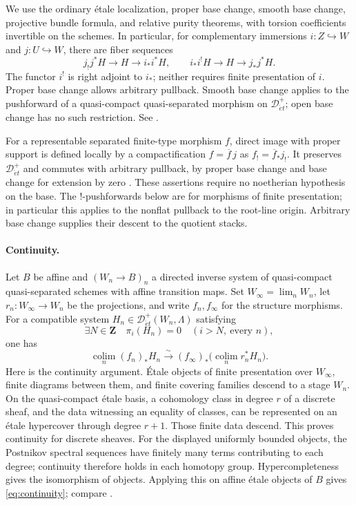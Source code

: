 \documentclass[11pt,a4paper]{article}
\newcommand{\Z}{\mathbf Z}
\newcommand{\colim}{\operatorname*{colim}}
\newcommand{\Det}{\mathcal D_{\acute et}}
\theoremstyle{notes}
\begin{document}
We use the ordinary étale localization, proper base change, smooth base change, projective bundle formula, and relative purity theorems, with torsion coefficients invertible on the schemes. In particular, for complementary immersions $i:Z\hookrightarrow W$ and $j:U\hookrightarrow W$, there are fiber sequences
\[
j_!j^*H\longrightarrow H\longrightarrow i_*i^*H,
\qquad i_*i^!H\longrightarrow H\longrightarrow j_*j^*H.
\]
The functor $i^!$ is right adjoint to $i_*$; neither requires finite presentation of $i$. Proper base change allows arbitrary pullback. Smooth base change applies to the pushforward of a quasi-compact quasi-separated morphism on $\Det^+$; open base change has no such restriction. See \cite[Sections 59.89 and 59.91]{Stacks}.

For a representable separated finite-type morphism $f$, direct image with proper support is defined locally by a compactification $f=\overline f\,j$ as $f_!=\overline f_*j_!$. It preserves $\Det^+$ and commutes with arbitrary pullback, by proper base change and base change for extension by zero \cite[Section 63.9, especially Lemma 63.9.4]{Stacks}. These assertions require no noetherian hypothesis on the base. The $!$-pushforwards below are for morphisms of finite presentation; in particular this applies to the nonflat pullback to the root-line origin. Arbitrary base change supplies their descent to the quotient stacks.

\paragraph{Continuity.}
Let $B$ be affine and $(W_n\to B)_n$ a directed inverse system of quasi-compact quasi-separated schemes with affine transition maps. Set $W_\infty=\lim_n W_n$, let $r_n:W_\infty\to W_n$ be the projections, and write $f_n,f_\infty$ for the structure morphisms. For a compatible system $H_n\in\Det^+(W_n,\Lambda)$ satisfying
\[
\exists N\in\Z\quad \pi_i(H_n)=0\quad(i>N,\ \text{every }n),
\]
one has
\begin{equation}\label{eq:continuity}
\colim_n(f_n)_*H_n\xrightarrow{\sim}
(f_\infty)_*\bigl(\colim_n r_n^*H_n\bigr).
\end{equation}
Here is the continuity argument. Étale objects of finite presentation over $W_\infty$, finite diagrams between them, and finite covering families descend to a stage $W_n$. On the quasi-compact étale basis, a cohomology class in degree $r$ of a discrete sheaf, and the data witnessing an equality of classes, can be represented on an étale hypercover through degree $r+1$. Those finite data descend. This proves continuity for discrete sheaves. For the displayed uniformly bounded objects, the Postnikov spectral sequences have finitely many terms contributing to each degree; continuity therefore holds in each homotopy group. Hypercompleteness gives the isomorphism of objects. Applying this on affine étale objects of $B$ gives \eqref{eq:continuity}; compare \cite[Tags 09Z1 and 0EZM]{Stacks}.
\end{document}
